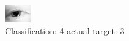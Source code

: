 \begin{figure}[h!]
\begin{center}
\includegraphics[width=0.60\columnwidth]{figures/ID109_class_4_target_3.png}
\end{center}
\caption{ Classification: 4 actual target: 3}
\label{fig:ID109_class_4_target_3}
\end{figure}
